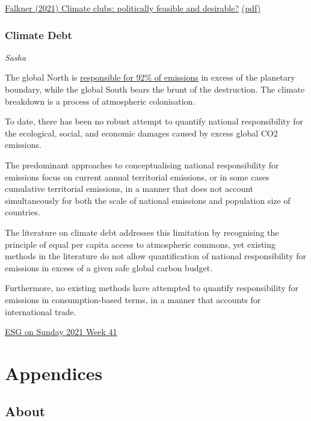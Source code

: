 \documentclass[
]{book}
\begin{document}
\href{https://www.tandfonline.com/doi/full/10.1080/14693062.2021.1967717}{Falkner (2021) Climate clubs: politically feasible and desirable?}
\href{pdf/Falkner_2021_Climate_Clubs.pdf}{(pdf)}

\hypertarget{climate-debt}{%
\section{Climate Debt}\label{climate-debt}}

\emph{Sasha}

The global North is \href{https://www.thelancet.com/journals/lanplh/article/PIIS2542-5196(20)30196-0/fulltext}{responsible for 92\% of emissions} in excess of the planetary boundary, while the global South bears the brunt of the destruction. The climate breakdown is a process of atmospheric colonisation.

To date, there has been no robust attempt to quantify national responsibility for the ecological, social, and economic damages caused by excess global CO2 emissions.

The predominant approaches to conceptualising national responsibility for emissions focus on current annual territorial emissions, or in some cases cumulative territorial emissions, in a manner that does not account simultaneously for both the scale of national emissions and population size of countries.

The literature on climate debt addresses this limitation by recognising the principle of equal per capita access to atmospheric commons, yet existing methods in the literature do not allow quantification of national responsibility for emissions in excess of a given safe global carbon budget.

Furthermore, no existing methods have attempted to quantify responsibility for emissions in consumption-based terms, in a manner that accounts for international trade.

\href{https://esgonasunday.substack.com/p/week-41-the-cop-drama-is-coming-the}{ESG on Sunday 2021 Week 41}

\hypertarget{part-appendices}{%
\part{Appendices}\label{part-appendices}}

\hypertarget{appendix-appendices}{%
\appendix}


\hypertarget{about}{%
\chapter{About}\label{about}}
\end{document}
